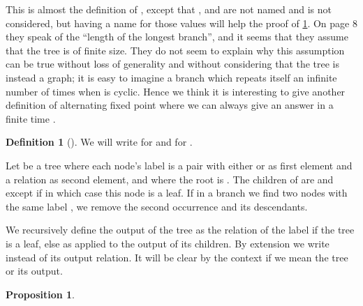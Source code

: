 \documentclass[a4paper,12pt]{article}
\theoremstyle{definition}
\newtheorem{definition}[theorem]{Definition}
\newtheorem{proposition}[theorem]{Proposition}
\begin{document}
This is almost the definition of \cite{nfp}, except that
,  and  are not named and  is not considered, but having a name for
those values will help the proof of \ref{eqab}. On page 8 they speak
of the ``length of the longest branch'', and it seems that they assume
that the tree is of finite size. They do not seem to explain why this
assumption can be true without loss of generality and without
considering that the tree is instead a graph; it is easy to imagine a
branch which repeats itself an infinite number of times when
 is cyclic. Hence we think it is interesting to
give another definition of alternating fixed point where we can always
give an answer in a finite time .

\begin{definition}[]
We will write  for  and  for .

Let  be a tree where each node's label is a pair
with either  or  as first element and a relation as second
element, and where the root is . The children of  are  and   except if  in
which case this node is a leaf. If in a branch we find two nodes with
the same label , we remove the second occurrence and its
descendants.

We recursively define the output of the tree as the relation of the
label if the tree is a leaf, else as  applied to the output of its
children. By extension we write  instead of its
output relation. It will be clear by the context if we mean the tree
or its output.
\end{definition}
\begin{proposition}\label{eqab}
  
\end{proposition}
\end{document}
